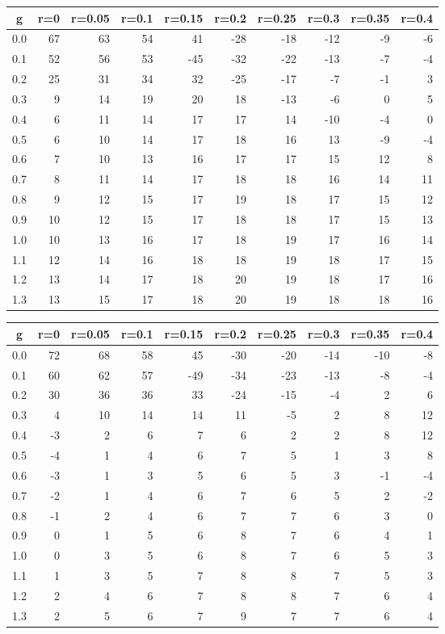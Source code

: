 %
\begin{table}[!tbp]
 \begin{center}
 \begin{tabular}{rrrrrrrrrr}\hline\hline
\multicolumn{1}{c}{g}&\multicolumn{1}{c}{r=0}&\multicolumn{1}{c}{r=0.05}&\multicolumn{1}{c}{r=0.1}&\multicolumn{1}{c}{r=0.15}&\multicolumn{1}{c}{r=0.2}&\multicolumn{1}{c}{r=0.25}&\multicolumn{1}{c}{r=0.3}&\multicolumn{1}{c}{r=0.35}&\multicolumn{1}{c}{r=0.4}\tabularnewline
\hline
0.0&67&63&54& 41&-28&-18&-12&-9&-6\tabularnewline
0.1&52&56&53&-45&-32&-22&-13&-7&-4\tabularnewline
0.2&25&31&34& 32&-25&-17& -7&-1& 3\tabularnewline
0.3& 9&14&19& 20& 18&-13& -6& 0& 5\tabularnewline
0.4& 6&11&14& 17& 17& 14&-10&-4& 0\tabularnewline
0.5& 6&10&14& 17& 18& 16& 13&-9&-4\tabularnewline
0.6& 7&10&13& 16& 17& 17& 15&12& 8\tabularnewline
0.7& 8&11&14& 17& 18& 18& 16&14&11\tabularnewline
0.8& 9&12&15& 17& 19& 18& 17&15&12\tabularnewline
0.9&10&12&15& 17& 18& 18& 17&15&13\tabularnewline
1.0&10&13&16& 17& 18& 19& 17&16&14\tabularnewline
1.1&12&14&16& 18& 18& 19& 18&17&15\tabularnewline
1.2&13&14&17& 18& 20& 19& 18&17&16\tabularnewline
1.3&13&15&17& 18& 20& 19& 18&18&16\tabularnewline
\hline
\end{tabular}

\end{center}

\end{table}

%
\begin{table}[!tbp]
 \begin{center}
 \begin{tabular}{rrrrrrrrrr}\hline\hline
\multicolumn{1}{c}{g}&\multicolumn{1}{c}{r=0}&\multicolumn{1}{c}{r=0.05}&\multicolumn{1}{c}{r=0.1}&\multicolumn{1}{c}{r=0.15}&\multicolumn{1}{c}{r=0.2}&\multicolumn{1}{c}{r=0.25}&\multicolumn{1}{c}{r=0.3}&\multicolumn{1}{c}{r=0.35}&\multicolumn{1}{c}{r=0.4}\tabularnewline
\hline
0.0&72&68&58& 45&-30&-20&-14&-10&-8\tabularnewline
0.1&60&62&57&-49&-34&-23&-13& -8&-4\tabularnewline
0.2&30&36&36& 33&-24&-15& -4&  2& 6\tabularnewline
0.3& 4&10&14& 14& 11& -5&  2&  8&12\tabularnewline
0.4&-3& 2& 6&  7&  6&  2&  2&  8&12\tabularnewline
0.5&-4& 1& 4&  6&  7&  5&  1&  3& 8\tabularnewline
0.6&-3& 1& 3&  5&  6&  5&  3& -1&-4\tabularnewline
0.7&-2& 1& 4&  6&  7&  6&  5&  2&-2\tabularnewline
0.8&-1& 2& 4&  6&  7&  7&  6&  3& 0\tabularnewline
0.9& 0& 1& 5&  6&  8&  7&  6&  4& 1\tabularnewline
1.0& 0& 3& 5&  6&  8&  7&  6&  5& 3\tabularnewline
1.1& 1& 3& 5&  7&  8&  8&  7&  5& 3\tabularnewline
1.2& 2& 4& 6&  7&  8&  8&  7&  6& 4\tabularnewline
1.3& 2& 5& 6&  7&  9&  7&  7&  6& 4\tabularnewline
\hline
\end{tabular}

\end{center}

\end{table}

